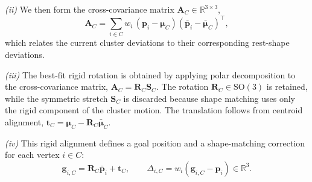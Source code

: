 \documentclass[letterpaper, 10 pt, conference]{ieeeconf}  %
\theoremstyle{tight}
\begin{document}
\emph{(ii)} We then form the cross-covariance matrix
$\mathbf{A}_C\in\mathbb{R}^{3\times3}$,
\begin{equation}
  \mathbf{A}_C = \sum_{i \in C} w_i\,
     (\mathbf{p}_i - \boldsymbol{\mu}_C)
     (\bar{\mathbf{p}}_i - \bar{\boldsymbol{\mu}}_C)^\top,
  \label{eq:covariance}
\end{equation}
which relates the current cluster deviations to their corresponding
rest-shape deviations.

\emph{(iii)} The best-fit rigid rotation is obtained by applying polar
decomposition to the cross-covariance matrix,
$\mathbf{A}_C=\mathbf{R}_C\mathbf{S}_C$. The rotation
$\mathbf{R}_C\in\mathrm{SO}(3)$ is retained, while the symmetric stretch
$\mathbf{S}_C$ is discarded because shape matching uses only the rigid
component of the cluster motion. The translation follows from centroid
alignment,
$\mathbf{t}_C=\boldsymbol{\mu}_C-\mathbf{R}_C\bar{\boldsymbol{\mu}}_C$.

\emph{(iv)} This rigid alignment defines a goal position and a
shape-matching correction for each vertex $i\in C$:
\begin{equation}
    \mathbf{g}_{i,C}
    =
    \mathbf{R}_C \bar{\mathbf{p}}_i + \mathbf{t}_C,
    \qquad
    \Delta_{i,C}
    =
    w_i(\mathbf{g}_{i,C}-\mathbf{p}_i) \in \mathbb{R}^3.
  \label{eq:cluster-correction}
\end{equation}

\end{document}
